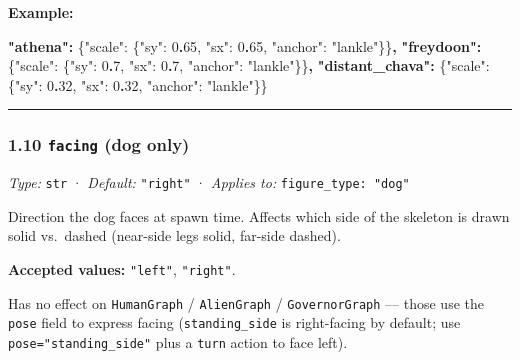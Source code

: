 \documentclass[
  11pt,
]{book}
\newenvironment{Shaded}{}{}
\newcommand{\DataTypeTok}[1]{\textcolor[rgb]{0.56,0.13,0.00}{#1}}
\newcommand{\DecValTok}[1]{\textcolor[rgb]{0.25,0.63,0.44}{#1}}
\newcommand{\ErrorTok}[1]{\textcolor[rgb]{1.00,0.00,0.00}{\textbf{#1}}}
\newcommand{\FunctionTok}[1]{\textcolor[rgb]{0.02,0.16,0.49}{#1}}
\newcommand{\StringTok}[1]{\textcolor[rgb]{0.25,0.44,0.63}{#1}}
\begin{document}
\textbf{Example:}

\begin{Shaded}
\begin{Highlighting}[]
\ErrorTok{"athena":}  \FunctionTok{\{}\DataTypeTok{"scale"}\FunctionTok{:} \FunctionTok{\{}\DataTypeTok{"sy"}\FunctionTok{:} \DecValTok{0}\ErrorTok{.}\DecValTok{65}\FunctionTok{,} \DataTypeTok{"sx"}\FunctionTok{:} \DecValTok{0}\ErrorTok{.}\DecValTok{65}\FunctionTok{,} \DataTypeTok{"anchor"}\FunctionTok{:} \StringTok{"lankle"}\FunctionTok{\}\}}\ErrorTok{,}
\ErrorTok{"freydoon":} \FunctionTok{\{}\DataTypeTok{"scale"}\FunctionTok{:} \FunctionTok{\{}\DataTypeTok{"sy"}\FunctionTok{:} \DecValTok{0}\ErrorTok{.}\DecValTok{7}\FunctionTok{,}  \DataTypeTok{"sx"}\FunctionTok{:} \DecValTok{0}\ErrorTok{.}\DecValTok{7}\FunctionTok{,}  \DataTypeTok{"anchor"}\FunctionTok{:} \StringTok{"lankle"}\FunctionTok{\}\}}\ErrorTok{,}
\ErrorTok{"distant\_chava":} \FunctionTok{\{}\DataTypeTok{"scale"}\FunctionTok{:} \FunctionTok{\{}\DataTypeTok{"sy"}\FunctionTok{:} \DecValTok{0}\ErrorTok{.}\DecValTok{32}\FunctionTok{,} \DataTypeTok{"sx"}\FunctionTok{:} \DecValTok{0}\ErrorTok{.}\DecValTok{32}\FunctionTok{,} \DataTypeTok{"anchor"}\FunctionTok{:} \StringTok{"lankle"}\FunctionTok{\}\}}
\end{Highlighting}
\end{Shaded}

\begin{center}\rule{0.5\linewidth}{0.5pt}\end{center}

\subsubsection{\texorpdfstring{1.10 \texttt{facing} (dog
only)}{1.10 facing (dog only)}}\label{facing-dog-only}

\emph{Type:} \texttt{str} · \emph{Default:} \texttt{"right"} ·
\emph{Applies to:} \texttt{figure\_type:\ "dog"}

Direction the dog faces at spawn time. Affects which side of the
skeleton is drawn solid vs.~dashed (near-side legs solid, far-side
dashed).

\textbf{Accepted values:} \texttt{"left"}, \texttt{"right"}.

Has no effect on \texttt{HumanGraph} / \texttt{AlienGraph} /
\texttt{GovernorGraph} --- those use the \texttt{pose} field to express
facing (\texttt{standing\_side} is right-facing by default; use
\texttt{pose="standing\_side"} plus a \texttt{turn} action to face
left).
\end{document}
